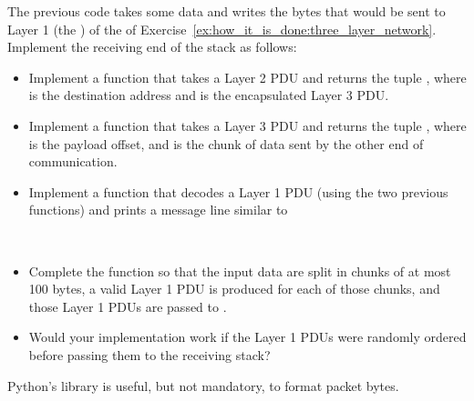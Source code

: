 \begin{center}
\end{center}

\begin{exercise}
The previous code takes some data and writes the bytes that would be sent to Layer 1 
(the ) of the  of Exercise~\ref{ex:how_it_is_done:three_layer_network}.
Implement the receiving end of the stack as follows: 

\begin{itemize}
\item Implement a  function that takes a Layer 2 PDU
  and returns the tuple , where  is the destination address and 
   is the encapsulated Layer 3 PDU.\\[-0.25cm]
  
\item Implement a  function that takes a Layer 3 PDU
  and returns the tuple , where  is the payload offset, and 
   is the chunk of data sent by the other end of communication.\\[-0.25cm]
  
\item Implement a  function that decodes a Layer 1 PDU (using the two previous functions)
  and prints a message line similar to 
  \begin{center}
  \end{center}\ \\[-0.75cm]
  
\item Complete the  function so that the input data are split in chunks of at most 100 bytes, 
      a valid Layer 1 PDU is produced for each of those chunks,
      and those Layer 1 PDUs are passed to .\\[-0.25cm]
      
\item Would your implementation work if the Layer 1 PDUs were randomly ordered before passing them to the receiving stack?
\end{itemize}
% 
\label{ex:how_it_is_done:implementation_three_layer_network}
\end{exercise}

\begin{remark}
Python's  library is useful, but not mandatory, to format packet bytes.
\end{remark}
